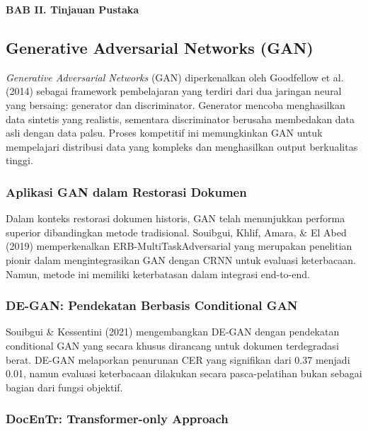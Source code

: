\documentclass[12pt,a4paper]{article}
\begin{document}
\vspace{2cm}
\begin{center}
{\fontsize{14}{16.8}\selectfont\textbf{BAB II. Tinjauan Pustaka}}\\[1em]
\end{center}
\label{sec:tinjauan-pustaka}

\subsection{Generative Adversarial Networks (GAN)}

\textit{Generative Adversarial Networks} (GAN) diperkenalkan oleh Goodfellow et al. (2014) sebagai framework pembelajaran yang terdiri dari dua jaringan neural yang bersaing: generator dan discriminator. Generator mencoba menghasilkan data sintetis yang realistis, sementara discriminator berusaha membedakan data asli dengan data palsu. Proses kompetitif ini memungkinkan GAN untuk mempelajari distribusi data yang kompleks dan menghasilkan output berkualitas tinggi.

\subsubsection{Aplikasi GAN dalam Restorasi Dokumen}

Dalam konteks restorasi dokumen historis, GAN telah menunjukkan performa superior dibandingkan metode tradisional. Souibgui, Khlif, Amara, \& El Abed (2019) memperkenalkan ERB-MultiTaskAdversarial yang merupakan penelitian pionir dalam mengintegrasikan GAN dengan CRNN untuk evaluasi keterbacaan. Namun, metode ini memiliki keterbatasan dalam integrasi end-to-end.

\subsubsection{DE-GAN: Pendekatan Berbasis Conditional GAN}

Souibgui \& Kessentini (2021) mengembangkan DE-GAN dengan pendekatan conditional GAN yang secara khusus dirancang untuk dokumen terdegradasi berat. DE-GAN melaporkan penurunan CER yang signifikan dari 0.37 menjadi 0.01, namun evaluasi keterbacaan dilakukan secara pasca-pelatihan bukan sebagai bagian dari fungsi objektif.

\subsubsection{DocEnTr: Transformer-only Approach}
\end{document}
